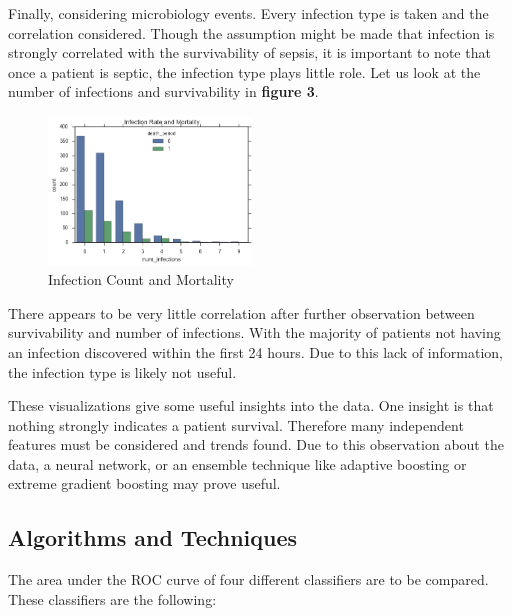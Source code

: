 \documentclass[11pt]{article}
\begin{document}
	Finally, considering microbiology events. Every infection type is taken and the correlation considered. Though the assumption might be made that infection is strongly correlated with the survivability of sepsis, it is important to note that once a patient is septic, the infection type plays little role. Let us look at the number of infections and survivability in \textbf{figure 3}.
	
	\begin{figure}
		\begin{center}
			\includegraphics[width=0.48\textwidth]{bio_graph.png}
		\end{center}
		\caption{Infection Count and Mortality}
	\end{figure}
	
	There appears to be very little correlation after further observation between survivability and number of infections. With the majority of patients not having an infection discovered within the first 24 hours. Due to this lack of information, the infection type is likely not useful. 
	
	
	These visualizations give some useful insights into the data. One insight is that nothing strongly indicates a patient survival. Therefore many independent features must be considered and trends found. Due to this observation about the data, a neural network, or an ensemble technique like adaptive boosting or extreme gradient boosting may prove useful. 
	
	
	\subsection{Algorithms and Techniques}
	The area under the ROC curve of four different classifiers are to be compared. These classifiers are the following:
	
\end{document}
